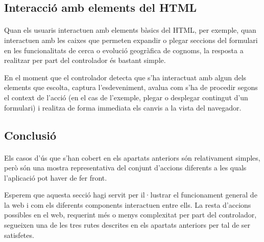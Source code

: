     \subsection{Interacció amb elements del HTML}

    \paragraph{}
    Quan els usuaris interactuen amb elements bàsics del HTML, per exemple, quan interactuen amb les caixes que permeten expandir o plegar seccions del formulari en les funcionalitats de cerca o evolució geogràfica de cognoms, la resposta a realitzar per part del controlador és bastant simple.

    En el moment que el controlador detecta que s'ha interactuat amb algun dels elements que escolta, captura l'esdeveniment, avalua com s'ha de procedir segons el context de l'acció (en el cas de l’exemple, plegar o desplegar contingut d'un formulari) i realitza de forma immediata els canvis a la vista del navegador.


    \subsection{Conclusió}

    \paragraph{}
    Els casos d'ús que s'han cobert en els apartats anteriors són relativament simples, però són una mostra representativa del conjunt d'accions diferents a les quals l'aplicació pot haver de fer front.

    Esperem que aquesta secció hagi servit per il·lustrar el funcionament general de la web i com els diferents components interactuen entre ells. La resta d’accions possibles en el web, requerint més o menys complexitat per part del controlador, segueixen una de les tres rutes descrites en els apartats anteriors per tal de ser satisfetes.

